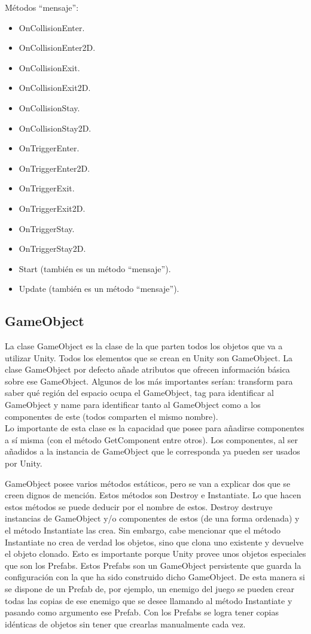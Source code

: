 Métodos “mensaje”:
\begin{itemize}
\item
OnCollisionEnter.
\item
OnCollisionEnter2D.
\item
OnCollisionExit.
\item
OnCollisionExit2D.
\item
OnCollisionStay.
\item
OnCollisionStay2D.
\item
OnTriggerEnter.
\item
OnTriggerEnter2D.
\item
OnTriggerExit.
\item
OnTriggerExit2D.
\item
OnTriggerStay.
\item
OnTriggerStay2D.
\item
Start (también es un método “mensaje”).
\item
Update (también es un método “mensaje”).
\end{itemize}

\subsection{GameObject}
La clase GameObject \cite{ClaseGameObject} es la clase de la que parten todos los objetos que va a utilizar Unity. Todos los elementos que se crean en Unity son GameObject. La clase GameObject por defecto añade atributos que ofrecen información básica sobre ese GameObject. Algunos de los más importantes serían: transform para saber qué región del espacio ocupa el GameObject, tag para identificar al GameObject y name para identificar tanto al GameObject como a los componentes de este (todos comparten el mismo nombre).\\
Lo importante de esta clase es la capacidad que posee para añadirse componentes a sí misma (con el método GetComponent entre otros). Los componentes, al ser añadidos a la instancia de GameObject que le corresponda ya pueden ser usados por Unity.

GameObject posee varios métodos estáticos, pero se van a explicar dos que se creen dignos de mención. Estos métodos son Destroy e Instantiate. Lo que hacen estos métodos se puede deducir por el nombre de estos. Destroy destruye instancias de GameObject y/o componentes de estos (de una forma ordenada) y el método Instantiate las crea. Sin embargo, cabe mencionar que el método Instantiate no crea de verdad los objetos, sino que clona uno existente y devuelve el objeto clonado. Esto es importante porque Unity provee unos objetos especiales que son los Prefabs. Estos Prefabs son un GameObject persistente que guarda la configuración con la que ha sido construido dicho GameObject. De esta manera si se dispone de un Prefab de, por ejemplo, un enemigo del juego se pueden crear todas las copias de ese enemigo que se desee llamando al método Instantiate y pasando como argumento ese Prefab. Con los Prefabs se logra tener copias idénticas de objetos sin tener que crearlas manualmente cada vez.

